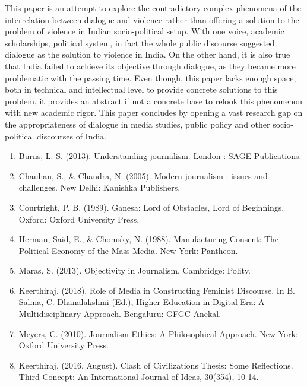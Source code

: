\begin{multicols}{2}

\noi
This paper is an attempt to explore the contradictory complex phenomena of the interrelation
between dialogue and violence rather than offering a solution to the problem of violence in Indian
socio-political setup. With one voice, academic scholarships, political system, in fact the whole
public discourse suggested dialogue as the solution to violence in India. On the other hand, it is
also true that India failed to achieve its objective through dialogue, as they became more
problematic with the passing time. Even though, this paper lacks enough space, both in technical
and intellectual level to provide concrete solutions to this problem, it provides an abstract if not a
concrete base to relook this phenomenon with new academic rigor. This paper concludes by
opening a vast research gap on the appropriateness of dialogue in media studies, public policy
and other socio-political discourses of India.


\begin{enumerate}[label=$\bullet$]
\item Burns, L. S. (2013). Understanding journalism. London : SAGE Publications.

\item Chauhan, S., \& Chandra, N. (2005). Modern journalism : issues and challenges. New Delhi: Kanishka Publishers.

\item Courtright, P. B. (1989). Ganesa: Lord of Obstacles, Lord of Beginnings. Oxford: Oxford University Press.

\item Herman, Said, E., \& Chomsky, N. (1988). Manufacturing Consent: The Political Economy of the Mass Media. New York: Pantheon. 

\item Maras, S. (2013). Objectivity in Journalism. Cambridge: Polity.

\item Keerthiraj. (2018). Role of Media in Constructing Feminist Discourse. In B. Salma, C. Dhanalakshmi (Ed.), Higher Education in Digital Era: A Multidisciplinary Approach. Bengaluru: GFGC Anekal.

\item Meyers, C. (2010). Journalism Ethics: A Philosophical Approach. New York: Oxford
University Press.

\item Keerthiraj. (2016, August). Clash of Civilizations Thesis: Some Reflections. Third
Concept: An International Journal of Ideas, 30(354), 10-14.


\end{enumerate}
\end{multicols}
